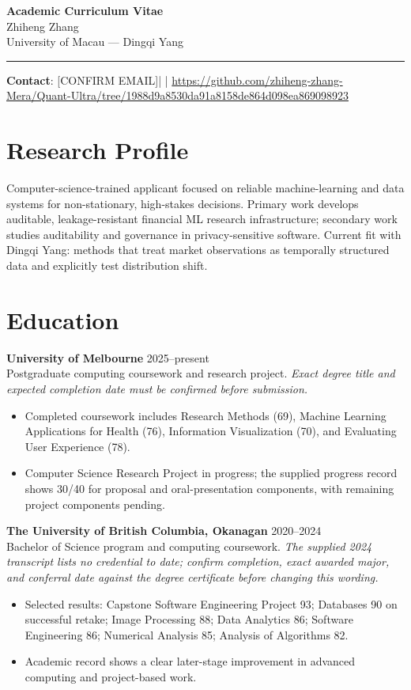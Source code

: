 \documentclass[11pt]{article}
\newcommand{\ApplicantName}{Zhiheng Zhang}
\newcommand{\ApplicantEmail}{[CONFIRM EMAIL]}
\newcommand{\ApplicantPhone}{[CONFIRM PHONE]}
\newcommand{\ApplicantGitHub}{\url{https://github.com/zhiheng-zhang-Mera/Quant-Ultra/tree/1988d9a8530da91a8158de864d098ea869098923}}
\begin{document}
\begin{center}
{\LARGE\bfseries Academic Curriculum Vitae}\\[0.25em]
{\large \ApplicantName}\\
University of Macau --- Dingqi Yang
\end{center}
\vspace{0.35em}\hrule\vspace{0.65em}

\textbf{Contact}: \ApplicantEmail\quad | \quad \ApplicantPhone\quad | \quad \ApplicantGitHub

\section*{Research Profile}
Computer-science-trained applicant focused on reliable machine-learning and data systems for non-stationary, high-stakes decisions. Primary work develops auditable, leakage-resistant financial ML research infrastructure; secondary work studies auditability and governance in privacy-sensitive software. Current fit with Dingqi Yang: methods that treat market observations as temporally structured data and explicitly test distribution shift.

\section*{Education}
\textbf{University of Melbourne} \hfill 2025--present\\
Postgraduate computing coursework and research project. \textit{Exact degree title and expected completion date must be confirmed before submission.}
\begin{itemize}
\item Completed coursework includes Research Methods (69), Machine Learning Applications for Health (76), Information Visualization (70), and Evaluating User Experience (78).
\item Computer Science Research Project in progress; the supplied progress record shows 30/40 for proposal and oral-presentation components, with remaining project components pending.
\end{itemize}

\textbf{The University of British Columbia, Okanagan} \hfill 2020--2024\\
Bachelor of Science program and computing coursework. \textit{The supplied 2024 transcript lists no credential to date; confirm completion, exact awarded major, and conferral date against the degree certificate before changing this wording.}
\begin{itemize}
\item Selected results: Capstone Software Engineering Project 93; Databases 90 on successful retake; Image Processing 88; Data Analytics 86; Software Engineering 86; Numerical Analysis 85; Analysis of Algorithms 82.
\item Academic record shows a clear later-stage improvement in advanced computing and project-based work.
\end{itemize}
\end{document}
